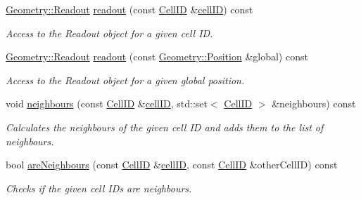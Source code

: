 \begin{DoxyCompactItemize}
\hyperlink{class_d_d4hep_1_1_geometry_1_1_readout}{Geometry\+::\+Readout} \hyperlink{class_d_d4hep_1_1_d_d_rec_1_1_i_d_decoder_a17c6775e5a61c095981bcda7014fa5e9}{readout} (const \hyperlink{namespace_d_d4hep_1_1_d_d_rec_af5cecc2e566eeaedb430b92df23971d4}{Cell\+ID} \&\hyperlink{class_d_d4hep_1_1_d_d_rec_1_1_i_d_decoder_abdd26643ae2f9f70de21b3a4699799bb}{cell\+ID}) const
\begin{DoxyCompactList}\small\item\em Access to the Readout object for a given cell ID. \end{DoxyCompactList}\item 
\hyperlink{class_d_d4hep_1_1_geometry_1_1_readout}{Geometry\+::\+Readout} \hyperlink{class_d_d4hep_1_1_d_d_rec_1_1_i_d_decoder_a7aa7188dd4516f2a73a6ee8f29d94d00}{readout} (const \hyperlink{namespace_d_d4hep_1_1_geometry_a55083902099d03506c6db01b80404900}{Geometry\+::\+Position} \&global) const
\begin{DoxyCompactList}\small\item\em Access to the Readout object for a given global position. \end{DoxyCompactList}\item 
void \hyperlink{class_d_d4hep_1_1_d_d_rec_1_1_i_d_decoder_a6616b016594126f62727c1f6f400412c}{neighbours} (const \hyperlink{namespace_d_d4hep_1_1_d_d_rec_af5cecc2e566eeaedb430b92df23971d4}{Cell\+ID} \&\hyperlink{class_d_d4hep_1_1_d_d_rec_1_1_i_d_decoder_abdd26643ae2f9f70de21b3a4699799bb}{cell\+ID}, std\+::set$<$ \hyperlink{namespace_d_d4hep_1_1_d_d_rec_af5cecc2e566eeaedb430b92df23971d4}{Cell\+ID} $>$ \&neighbours) const
\begin{DoxyCompactList}\small\item\em Calculates the neighbours of the given cell ID and adds them to the list of neighbours. \end{DoxyCompactList}\item 
bool \hyperlink{class_d_d4hep_1_1_d_d_rec_1_1_i_d_decoder_aede1052576f386f89d1ecd1ecc184bd8}{are\+Neighbours} (const \hyperlink{namespace_d_d4hep_1_1_d_d_rec_af5cecc2e566eeaedb430b92df23971d4}{Cell\+ID} \&\hyperlink{class_d_d4hep_1_1_d_d_rec_1_1_i_d_decoder_abdd26643ae2f9f70de21b3a4699799bb}{cell\+ID}, const \hyperlink{namespace_d_d4hep_1_1_d_d_rec_af5cecc2e566eeaedb430b92df23971d4}{Cell\+ID} \&other\+Cell\+ID) const
\begin{DoxyCompactList}\small\item\em Checks if the given cell I\+Ds are neighbours. \end{DoxyCompactList}\item 

\end{DoxyCompactItemize}
